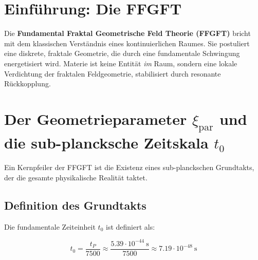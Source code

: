 	
	

	\begin{abstract}
		Die \textbf{Fundamental Fraktal Geometrische Feld Theorie (FFGFT)} beschreibt die Raumzeit als ein hierarchisches System aus fraktalen Faltungen, getrieben durch den fundamentalen Geometrieparameter $\xi_{\text{par}} = 4/30000$ und die zugehörige Grundfrequenz $f_0 = 1/t_0$ im sub-planckschen Bereich. Dieses Dokument legt die vollständigen mathematischen Grundlagen dar: die exakte Definition des Grundtakts $t_0$, die Rückkopplungsbedingung im geschlossenen 4D-Phasen-Torus (der nicht mit einem 3D-Torus plus Zeitkontinuum zu verwechseln ist), die Übersetzung des 4D-Vektorraums in einen mehrdimensionalen Matrixraum sowie die photonische Realisierung durch TFLN-Hardware.
	\end{abstract}
	
	

	\section{Einführung: Die FFGFT}
	
	Die \textbf{Fundamental Fraktal Geometrische Feld Theorie (FFGFT)} bricht mit dem klassischen Verständnis eines kontinuierlichen Raumes. Sie postuliert eine diskrete, fraktale Geometrie, die durch eine fundamentale Schwingung energetisiert wird. Materie ist keine Entität \textit{im} Raum, sondern eine lokale Verdichtung der fraktalen Feldgeometrie, stabilisiert durch resonante Rückkopplung.
	
	\section{Der Geometrieparameter $\xi_{\text{par}}$ und die sub-plancksche Zeitskala $t_0$}
	
	Ein Kernpfeiler der FFGFT ist die Existenz eines sub-planckschen Grundtakts, der die gesamte physikalische Realität taktet.
	
	\subsection{Definition des Grundtakts}
	
	Die fundamentale Zeiteinheit $t_0$ ist definiert als:
	
	\begin{equation}
		t_0 = \frac{t_P}{7500} \approx \frac{5.39 \cdot 10^{-44}~\text{s}}{7500} \approx 7.19 \cdot 10^{-48}~\text{s}
	\end{equation}
	
